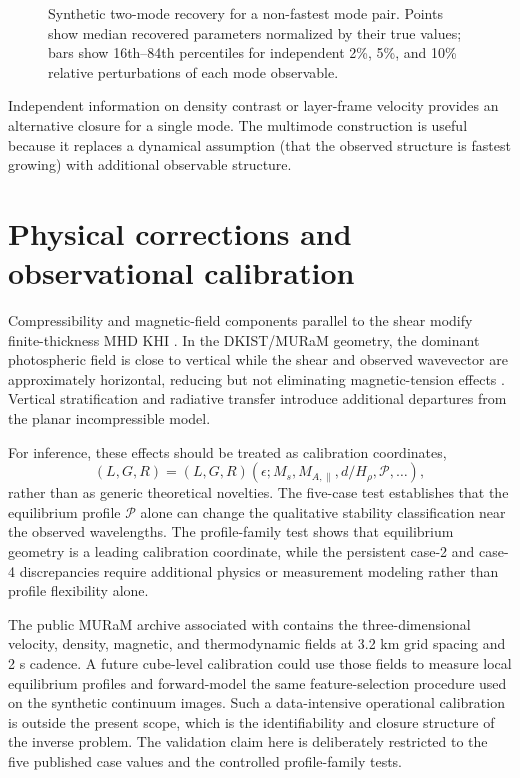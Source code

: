 \documentclass[linenumbers]{aastex7}
\begin{document}
\begin{figure}
\caption{Synthetic two-mode recovery for a non-fastest mode pair. Points show median recovered parameters normalized by their true values; bars show 16th--84th percentiles for independent 2\%, 5\%, and 10\% relative perturbations of each mode observable.}
\label{fig:mm-recovery}
\end{figure}

Independent information on density contrast or layer-frame velocity provides an alternative closure for a single mode. The multimode construction is useful because it replaces a dynamical assumption (that the observed structure is fastest growing) with additional observable structure.

\section{Physical corrections and observational calibration}
Compressibility and magnetic-field components parallel to the shear modify finite-thickness MHD KHI \citep{MiuraPritchett1982}. In the DKIST/MURaM geometry, the dominant photospheric field is close to vertical while the shear and observed wavevector are approximately horizontal, reducing but not eliminating magnetic-tension effects \citep{Kuridze2026}. Vertical stratification and radiative transfer introduce additional departures from the planar incompressible model.

For inference, these effects should be treated as calibration coordinates,
\begin{equation}
(L,G,R)=(L,G,R)
(\epsilon;M_s,M_{A,\parallel},d/H_\rho,\mathcal{P},\ldots),
\end{equation}
rather than as generic theoretical novelties. The five-case test establishes that the equilibrium profile $\mathcal{P}$ alone can change the qualitative stability classification near the observed wavelengths. The profile-family test shows that equilibrium geometry is a leading calibration coordinate, while the persistent case-2 and case-4 discrepancies require additional physics or measurement modeling rather than profile flexibility alone.

The public MURaM archive associated with \citet{Kuridze2026} contains the three-dimensional velocity, density, magnetic, and thermodynamic fields at 3.2 km grid spacing and 2 s cadence. A future cube-level calibration could use those fields to measure local equilibrium profiles and forward-model the same feature-selection procedure used on the synthetic continuum images. Such a data-intensive operational calibration is outside the present scope, which is the identifiability and closure structure of the inverse problem. The validation claim here is deliberately restricted to the five published case values and the controlled profile-family tests.
\end{document}
